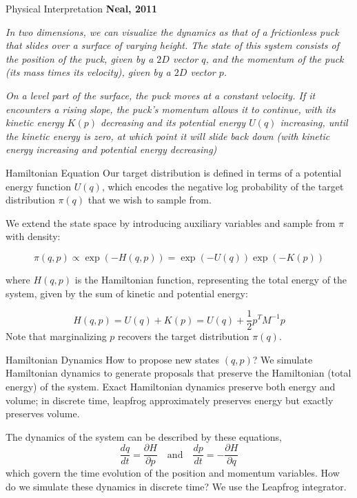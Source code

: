 \begin{frame}{Physical Interpretation}
	\textbf{Neal, 2011}

	\textit{
		In two dimensions, we can visualize the dynamics as that of a frictionless puck that
		slides over a surface of varying height. The state of this system consists of the
		position of the puck, given by a $2D$ vector $q$, and the momentum of the puck
		(its mass times its velocity), given by a $2D$ vector $p$.}

	\vspace{0.5cm}
	\textit{
		On a level part of the surface, the puck moves at a constant velocity.
		If it encounters a rising slope, the puck's momentum allows it to continue, with its
		kinetic energy $K(p)$ decreasing and its potential energy $U(q)$ increasing, until the kinetic energy
		is zero, at which point it will slide back down (with kinetic energy increasing and
		potential energy decreasing)}
\end{frame}

\begin{frame}{Hamiltonian Equation}
	Our target distribution is defined in terms of a potential energy function $U(q)$,
	which encodes the negative log probability of the target distribution $\pi(q)$ that we wish to sample from.

	We extend the state space by introducing auxiliary variables and sample from $\pi$ with density:
	
	\begin{equation*}
		\pi(q, p) \propto \exp(-H(q, p)) = \exp(-U(q)) \exp(-K(p))	
	\end{equation*}

	where $H(q, p)$ is the Hamiltonian function, representing the total energy of the system,
	given by the sum of kinetic and potential energy:

	\begin{equation*}
		H(q, p) = U(q) + K(p) = U(q) + \frac{1}{2} p^T M^{-1} p
	\end{equation*}
	Note that marginalizing $p$ recovers the target distribution $\pi(q)$.
\end{frame}

\begin{frame}{Hamiltonian Dynamics}
	How to propose new states $(q, p)$? We simulate Hamiltonian dynamics to generate proposals that
	preserve the Hamiltonian (total energy) of the system. Exact Hamiltonian dynamics preserve both energy and volume; in discrete time, leapfrog approximately preserves energy but exactly preserves volume.
	
	\vspace{0.4cm}
	The dynamics of the system can be described by these equations,
	\begin{equation*}
		\frac{dq}{dt} = \frac{\partial H}{\partial p} \quad \text{and} \quad
		\frac{dp}{dt} = -\frac{\partial H}{\partial q}
	\end{equation*}
	which govern
	the time evolution of the position and momentum variables. How do we simulate these dynamics 
	in discrete time? We use the Leapfrog integrator.
\end{frame}

